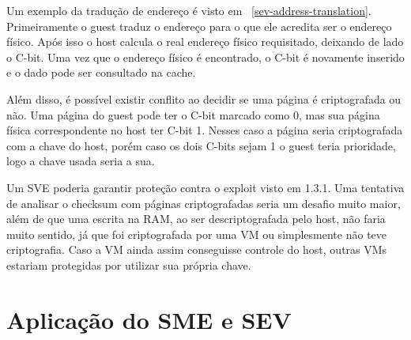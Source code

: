 \documentclass{report}
\begin{document}
Um exemplo da tradução de endereço é visto em ~\ref{sev-address-translation}.
Primeiramente o guest traduz o endereço para o que ele acredita ser o endereço
físico. Após isso o host calcula o real endereço físico requisitado, deixando
de lado o C-bit. Uma vez que o endereço físico é encontrado, o C-bit é
novamente inserido e o dado pode ser consultado na cache.

Além disso, é possível existir conflito ao decidir se uma página é criptografada
ou não. Uma página do guest pode ter o C-bit marcado como 0, mas sua página
física correspondente no host ter C-bit 1. Nesses caso a página seria
criptografada com a chave do host, porém caso os dois C-bits sejam 1 o guest
teria prioridade, logo a chave usada seria a sua.

Um SVE poderia garantir proteção contra o exploit visto em 1.3.1. Uma
tentativa de analisar o checksum com páginas criptografadas seria um desafio
muito maior, além de que uma escrita na RAM, ao ser descriptografada pelo host,
não faria muito sentido, já que foi criptografada por uma VM ou simplesmente
não teve criptografia. Caso a VM ainda assim conseguisse controle do host,
outras VMs estariam protegidas por utilizar sua própria chave.

\section{Aplicação do SME e SEV}

\section{}


\nocite{*}

\end{document}
